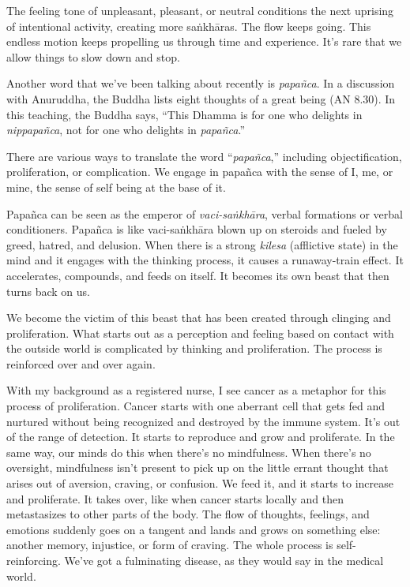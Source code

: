 The feeling tone of unpleasant, pleasant, or neutral conditions the next uprising of intentional activity, creating more saṅkhāras. The flow keeps going. This endless motion keeps propelling us through time and experience. It's rare that we allow things to slow down and stop.

Another word that we've been talking about recently is \emph{papañca}. In a discussion with Anuruddha, the Buddha lists eight thoughts of a great being (AN 8.30). In this teaching, the Buddha says, ``This Dhamma is for one who delights in \emph{nippapañca}, not for one who delights in \emph{papañca}.''

There are various ways to translate the word ``\emph{papañca},'' including objectification, proliferation, or complication. We engage in papañca with the sense of I, me, or mine, the sense of self being at the base of it.

Papañca can be seen as the emperor of \emph{vaci-saṅkhāra}, verbal formations or verbal conditioners. Papañca is like vaci-saṅkhāra blown up on steroids and fueled by greed, hatred, and delusion. When there is a strong \emph{kilesa} (afflictive state) in the mind and it engages with the thinking process, it causes a runaway-train effect. It accelerates, compounds, and feeds on itself. It becomes its own beast that then turns back on us.

We become the victim of this beast that has been created through clinging and proliferation. What starts out as a perception and feeling based on contact with the outside world is complicated by thinking and proliferation. The process is reinforced over and over again.

With my background as a registered nurse, I see cancer as a metaphor for this process of proliferation. Cancer starts with one aberrant cell that gets fed and nurtured without being recognized and destroyed by the immune system. It's out of the range of detection. It starts to reproduce and grow and proliferate. In the same way, our minds do this when there's no mindfulness. When there's no oversight, mindfulness isn't present to pick up on the little errant thought that arises out of aversion, craving, or confusion. We feed it, and it starts to increase and proliferate. It takes over, like when cancer starts locally and then metastasizes to other parts of the body. The flow of thoughts, feelings, and emotions suddenly goes on a tangent and lands and grows on something else: another memory, injustice, or form of craving. The whole process is self-reinforcing. We've got a fulminating disease, as they would say in the medical world.

